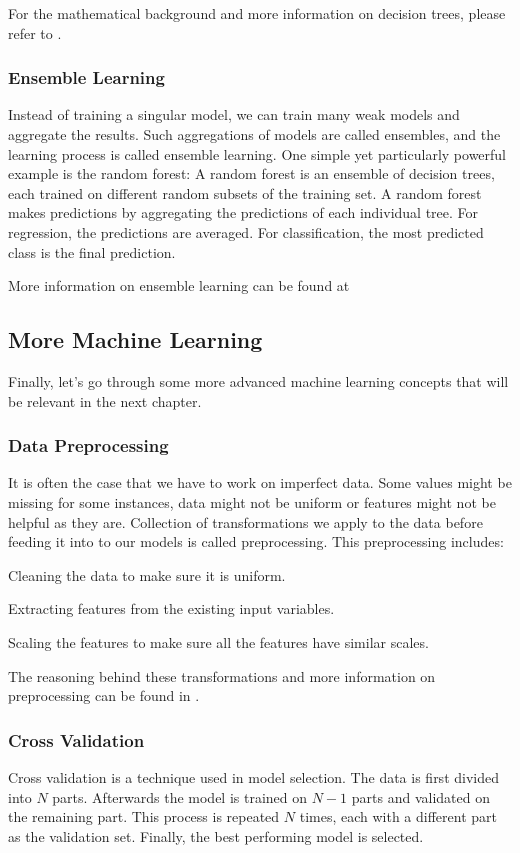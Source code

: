 For the mathematical background and more information on decision trees, please refer to \parencite{homl:6}.

\subsubsection{Ensemble Learning}
Instead of training a singular model, we can train many weak models and aggregate the results.
Such aggregations of models are called ensembles, and the learning process is called ensemble learning.
One simple yet particularly powerful example is the random forest:
A random forest is an ensemble of decision trees, each trained on different random subsets of the training set.
A random forest makes predictions by aggregating the predictions of each individual tree.
For regression, the predictions are averaged.
For classification, the most predicted class is the final prediction.\parencite{homl:7}
 
More information on ensemble learning can be found at \parencite{homl:7}

\subsection{More Machine Learning}
Finally, let's go through some more advanced machine learning concepts that will be relevant in the next chapter.
\subsubsection{Data Preprocessing}
It is often the case that we have to work on imperfect data.
Some values might be missing for some instances, data might not be uniform or features might not be helpful as they are.
Collection of transformations we apply to the data before feeding it into to our models is called preprocessing.\parencite{homl:2}
This preprocessing includes:

Cleaning the data to make sure it is uniform.

Extracting features from the existing input variables.

Scaling the features to make sure all the features have similar scales.

The reasoning behind these transformations and more information on preprocessing can be found in \parencite{homl:2}.

\subsubsection{Cross Validation}
Cross validation is a technique used in model selection.
The data is first divided into $N$ parts.
Afterwards the model is trained on $N-1$ parts and validated on the remaining part.
This process is repeated $N$ times, each with a different part as the validation set.
Finally, the best performing model is selected.\parencite{ml:prml}
